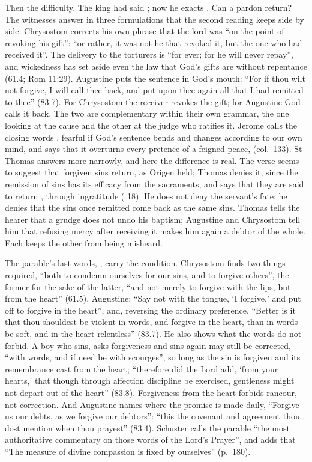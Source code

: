 Then the difficulty. The king had said ; now he
exacts . Can a pardon return? The witnesses answer in
three formulations that the second reading keeps side by side. Chrysostom
corrects his own phrase that the lord was ``on the point of revoking his gift'':
``or rather, it was not he that revoked it, but the one who had received it''.
The delivery to the torturers is ``for ever; for he will never repay'', and
wickedness has set aside even the law that God's gifts are without repentance
(61.4; Rom 11:29). Augustine puts the sentence in God's mouth: ``For if thou wilt
not forgive, I will call thee back, and put upon thee again all that I had
remitted to thee'' (83.7). For Chrysostom the receiver revokes the gift; for
Augustine God calls it back. The two are complementary within their own grammar,
the one looking at the cause and the other at the judge who ratifies it. Jerome
calls the closing words , fearful if God's sentence
bends and changes according to our own mind, and says that it overturns every
pretence of a feigned peace, 
(col.~133). St Thomas answers more narrowly, and here the difference is real. The
verse seems to suggest that forgiven sins return, as Origen held; Thomas denies
it, since the remission of sins has its efficacy from the sacraments, and says
that they are said to return , through ingratitude
( 18). He does not deny the servant's fate; he denies that
the sins once remitted come back as the same sins. Thomas tells the hearer that a
grudge does not undo his baptism; Augustine and Chrysostom tell him that refusing
mercy after receiving it makes him again a debtor of the whole. Each keeps the
other from being misheard.

The parable's last words, , carry the condition.
Chrysostom finds two things required, ``both to condemn ourselves for our sins,
and to forgive others'', the former for the sake of the latter, ``and not merely
to forgive with the lips, but from the heart'' (61.5). Augustine: ``Say not with
the tongue, `I forgive,' and put off to forgive in the heart'', and, reversing
the ordinary preference, ``Better is it that thou shouldest be violent in words,
and forgive in the heart, than in words be soft, and in the heart relentless''
(83.7). He also shows what the words do not forbid. A boy who sins, asks forgiveness and sins again may still be
corrected, ``with words, and if need be with scourges'', so long as the sin is
forgiven and its remembrance cast from the heart; ``therefore did the Lord add,
`from your hearts,' that though through affection discipline be exercised,
gentleness might not depart out of the heart'' (83.8). Forgiveness from the heart
forbids rancour, not correction. And Augustine names where the promise is made
daily, ``Forgive us our debts, as we forgive our debtors'': ``this the covenant
and agreement thou dost mention when thou prayest'' (83.4). Schuster calls the
parable ``the most authoritative commentary on those words of the Lord's
Prayer'', and adds that ``The measure of divine compassion is fixed by
ourselves'' (p.~180).

